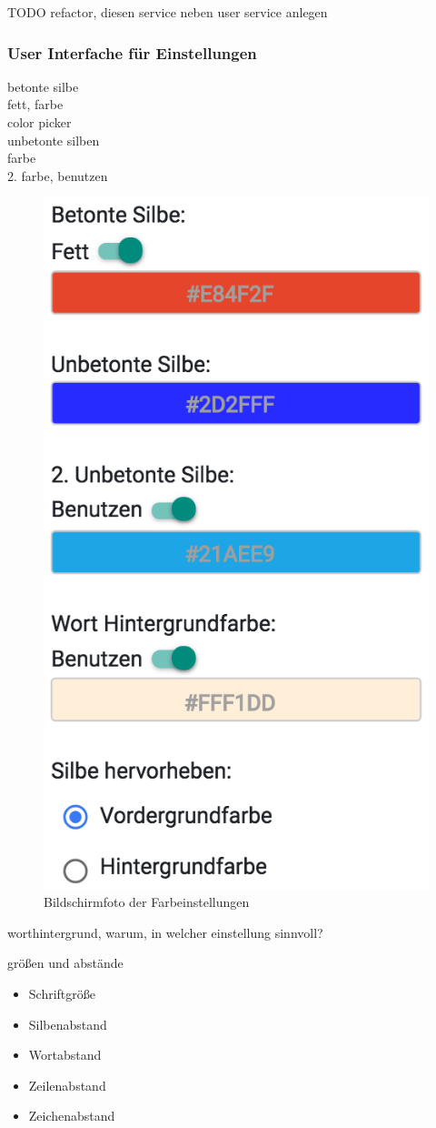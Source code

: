TODO refactor, diesen service neben user service anlegen

\subsubsection{User Interfache für Einstellungen}
betonte silbe\\
fett, farbe\\

color picker\\

unbetonte silben\\
farbe\\
2. farbe, benutzen\\

\begin{figure}[h!]
	\centering
	\includegraphics[width=.4\linewidth, frame]{figures/frontend/config-color}
	\caption{Bildschirmfoto der Farbeinstellungen}
	\label{fig:frontend-colorconf}
\end{figure}

worthintergrund, warum, in welcher einstellung sinnvoll?

größen und abstände\\
\begin{itemize}
	\item Schriftgröße
	\item Silbenabstand
	\item Wortabstand
	\item Zeilenabstand
	\item Zeichenabstand
\end{itemize}

